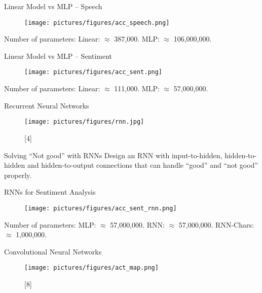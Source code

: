 \documentclass{beamer}
\begin{document}
\begin{frame}{Linear Model vs MLP -- Speech}
\begin{figure}
\texttt{[image: pictures/figures/acc\_speech.png]}
\end{figure}
Number of parameters: Linear: $\approx$ 387,000. MLP: $\approx$ 106,000,000.
\end{frame}


\begin{frame}{Linear Model vs MLP -- Sentiment}
\begin{figure}
\texttt{[image: pictures/figures/acc\_sent.png]}
\end{figure}
Number of parameters: Linear: $\approx$ 111,000. MLP: $\approx$ 57,000,000.
\end{frame}


\begin{frame}{Recurrent Neural Networks}
\begin{figure}
\texttt{[image: pictures/figures/rnn.jpg]}
\caption*{[4]}
\end{figure}
\end{frame}


\begin{frame}{Solving ``Not good'' with RNNs}
Design an RNN with input-to-hidden, hidden-to-hidden and hidden-to-output connections that can handle ``good'' and ``not good'' properly.

\end{frame}


\begin{frame}{RNNs for Sentiment Analysis}
\begin{figure}
\texttt{[image: pictures/figures/acc\_sent\_rnn.png]}
\end{figure}
Number of parameters: MLP: $\approx$ 57,000,000. RNN: $\approx$ 57,000,000. RNN-Chars: $\approx$ 1,000,000.
\end{frame}


\begin{frame}{Convolutional Neural Networks}
\begin{figure}
\texttt{[image: pictures/figures/act\_map.png]}
\caption*{[8]}
\end{figure}
\end{frame}
\end{document}
